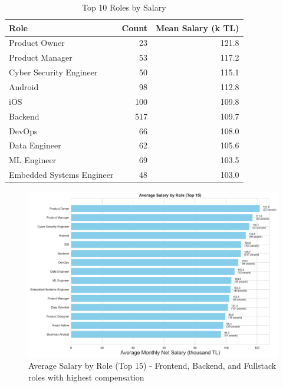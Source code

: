 \documentclass[12pt,a4paper]{article}
\begin{document}
\begin{table}[H]
	\centering
	\small
	\begin{tabular}{lrr}
		\toprule
		\textbf{Role}             & \textbf{Count} & \textbf{Mean Salary (k TL)} \\
		\midrule
		Product Owner             & 23             & 121.8                       \\
		Product Manager           & 53             & 117.2                       \\
		Cyber Security Engineer   & 50             & 115.1                       \\
		Android                   & 98             & 112.8                       \\
		iOS                       & 100            & 109.8                       \\
		Backend                   & 517            & 109.7                       \\
		DevOps                    & 66             & 108.0                       \\
		Data Engineer             & 62             & 105.6                       \\
		ML Engineer               & 69             & 103.5                       \\
		Embedded Systems Engineer & 48             & 103.0                       \\
		\bottomrule
	\end{tabular}
	\caption{Top 10 Roles by Salary}
\end{table}

\begin{figure}[H]
    \centering
    \includegraphics[width=\textwidth]{figures/barplot_role_salaries.png}
    \caption{Average Salary by Role (Top 15) - Frontend, Backend, and Fullstack roles with highest compensation}
\end{figure}
\end{document}
